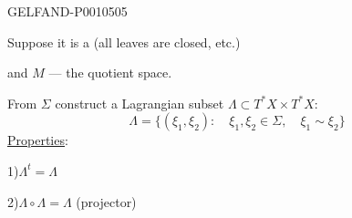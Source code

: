 \begin{GelfandAdjacentEvidence}{GELFAND-P001050}{5}

Suppose it is a  (all leaves are closed, etc.)
\end{GelfandAdjacentEvidence}

and $M$ — the quotient space.

From $\Sigma$ construct a Lagrangian subset $\Lambda\subset T^*X\times T^*X$:
\[
\Lambda=\{(\xi_1,\xi_2):\quad\xi_1,\xi_2\in\Sigma,\quad\xi_1\sim\xi_2\}
\]
\underline{Properties}:

1)\quad $\Lambda^t=\Lambda$

2)\quad $\Lambda\circ\Lambda=\Lambda$ \qquad (projector)


